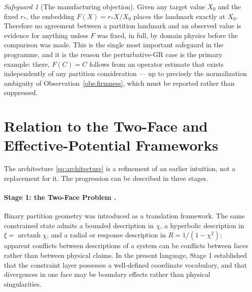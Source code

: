 \documentclass[11pt,a4paper]{article}
\theoremstyle{definition}
\theoremstyle{plain}
\theoremstyle{remark}
\newtheorem{safeguard}[definition]{Safeguard}
\newcommand{\Rresp}{R}
\begin{document}
\begin{safeguard}[The manufacturing objection]
\label{safe:manufacture}
Given any target value $X_{0}$ and the fixed $r_{*}$, the embedding
$F(X)=r_{*}X/X_{0}$ places the landmark exactly at $X_{0}$. Therefore no
agreement between a partition landmark and an observed value is evidence for
anything unless $F$ was fixed, in full, by domain physics before the
comparison was made. This is the single most important safeguard in the
programme, and it is the reason the perturbative-GR case is the primary example:
there, $F(C)=C$ follows from an operator estimate that exists independently of
any partition consideration --- up to precisely the normalization ambiguity of
Observation~\ref{obs:firmness}, which must be reported rather than suppressed.
\end{safeguard}

\section{Relation to the Two-Face and Effective-Potential Frameworks}
\label{sec:priorframeworks}

The architecture \eqref{eq:architecture} is a refinement of an earlier
intuition, not a replacement for it. The progression can be described in three
stages.

\paragraph{Stage 1: the Two-Face Problem \cite{TwoFace}.}
Binary partition geometry was introduced as a translation framework. The same
constrained state admits a bounded description in $\chi$, a hyperbolic
description in $\xi=\operatorname{arctanh}\chi$, and a radial or response
description in $\Rresp=1/(1-\chi^{2})$; apparent conflicts between
descriptions of a system can be conflicts between faces rather than between
physical claims. In the present language, Stage 1 established that the
constraint layer possesses a well-defined coordinate vocabulary, and that
divergences in one face may be boundary effects rather than physical
singularities.
\end{document}
